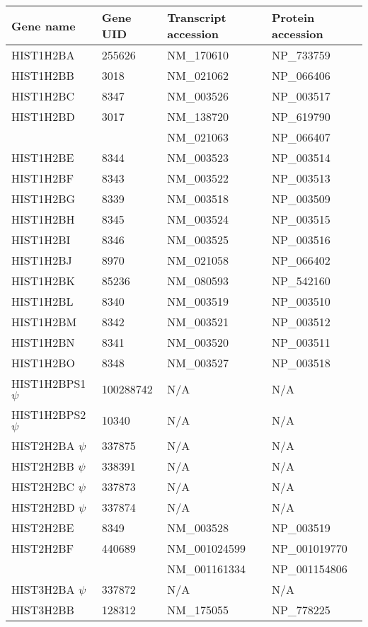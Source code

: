 \begin{tabular}{l | l | l | l }
  Gene name & Gene UID & Transcript accession & Protein accession \\
  \hline
   HIST1H2BA & 255626 & NM\_170610 & NP\_733759 \\
   HIST1H2BB & 3018 & NM\_021062 & NP\_066406 \\
   HIST1H2BC & 8347 & NM\_003526 & NP\_003517 \\
   HIST1H2BD & 3017 & NM\_138720 & NP\_619790 \\
   \null     & \null & NM\_021063 & NP\_066407 \\
   HIST1H2BE & 8344 & NM\_003523 & NP\_003514 \\
   HIST1H2BF & 8343 & NM\_003522 & NP\_003513 \\
   HIST1H2BG & 8339 & NM\_003518 & NP\_003509 \\
   HIST1H2BH & 8345 & NM\_003524 & NP\_003515 \\
   HIST1H2BI & 8346 & NM\_003525 & NP\_003516 \\
   HIST1H2BJ & 8970 & NM\_021058 & NP\_066402 \\
   HIST1H2BK & 85236 & NM\_080593 & NP\_542160 \\
   HIST1H2BL & 8340 & NM\_003519 & NP\_003510 \\
   HIST1H2BM & 8342 & NM\_003521 & NP\_003512 \\
   HIST1H2BN & 8341 & NM\_003520 & NP\_003511 \\
   HIST1H2BO & 8348 & NM\_003527 & NP\_003518 \\
   HIST1H2BPS1 $\psi$ & 100288742 & N/A & N/A \\
   HIST1H2BPS2 $\psi$ & 10340 & N/A & N/A \\
   HIST2H2BA $\psi$ & 337875 & N/A & N/A \\
   HIST2H2BB $\psi$ & 338391 & N/A & N/A \\
   HIST2H2BC $\psi$ & 337873 & N/A & N/A \\
   HIST2H2BD $\psi$ & 337874 & N/A & N/A \\
   HIST2H2BE & 8349 & NM\_003528 & NP\_003519 \\
   HIST2H2BF & 440689 & NM\_001024599 & NP\_001019770 \\
   \null     & \null  & NM\_001161334 & NP\_001154806 \\
   HIST3H2BA $\psi$ & 337872 & N/A & N/A \\
   HIST3H2BB & 128312 & NM\_175055 & NP\_778225 \\
\end{tabular}
